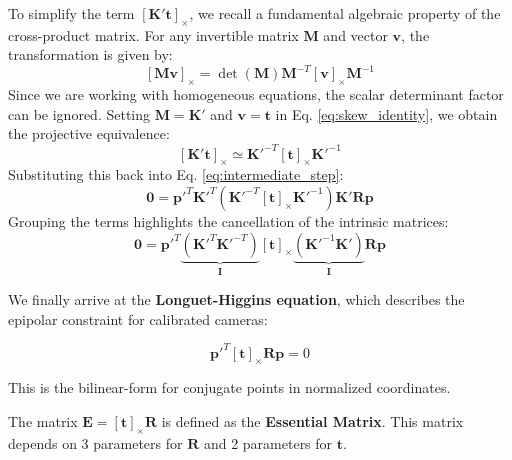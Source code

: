 \documentclass[11pt,a4paper]{article}
\theoremstyle{definition}
\theoremstyle{plain}
\theoremstyle{remark}
\begin{document}
To simplify the term $[\mathbf{K'}\mathbf{t}]_{\times}$, we recall a fundamental algebraic property of the cross-product matrix. For any invertible matrix $\mathbf{M}$ and vector $\mathbf{v}$, the transformation is given by:
\begin{equation} \label{eq:skew_identity}
    [\mathbf{M}\mathbf{v}]_{\times} = \det(\mathbf{M}) \mathbf{M}^{-T} [\mathbf{v}]_{\times} \mathbf{M}^{-1}
\end{equation}
Since we are working with homogeneous equations, the scalar determinant factor can be ignored. Setting $\mathbf{M} = \mathbf{K'}$ and $\mathbf{v} = \mathbf{t}$ in Eq. \eqref{eq:skew_identity}, we obtain the projective equivalence:
\begin{equation} \nonumber
    [\mathbf{K'}\mathbf{t}]_{\times} \simeq \mathbf{K'}^{-T} [\mathbf{t}]_{\times} \mathbf{K'}^{-1}
\end{equation}
Substituting this back into Eq. \eqref{eq:intermediate_step}:
\begin{equation} \nonumber
    \mathbf{0} = \mathbf{p'}^{T} \mathbf{K'}^{T} \left( \mathbf{K'}^{-T} [\mathbf{t}]_{\times} \mathbf{K'}^{-1} \right) \mathbf{K'}\mathbf{R} \mathbf{p}
\end{equation}
Grouping the terms highlights the cancellation of the intrinsic matrices:
\begin{equation} \nonumber
    \mathbf{0} = \mathbf{p'}^{T} \underbrace{\left(\mathbf{K'}^{T} \mathbf{K'}^{-T}\right)}_{\mathbf{I}} [\mathbf{t}]_{\times} \underbrace{\left(\mathbf{K'}^{-1} \mathbf{K'}\right)}_{\mathbf{I}} \mathbf{R} \mathbf{p}
\end{equation}

We finally arrive at the \textbf{Longuet-Higgins equation}, which describes the epipolar constraint for calibrated cameras:

\begin{tcolorbox}[colback=blue!5!white,colframe=blue!75!black,title=Longuet-Higgins Equation]
\begin{equation} \label{eq:longuet_higgins_final}
    \mathbf{p'}^{T} [\mathbf{t}]_{\times} \mathbf{R} \mathbf{p} = 0
\end{equation}
\end{tcolorbox}
This is the bilinear-form for conjugate points in normalized coordinates.

\begin{tcolorbox}[colback=orange!5!white,colframe=orange!75!black,title=Essential Matrix]
The matrix $\mathbf{E} = [\mathbf{t}]_{\times} \mathbf{R}$ is defined as the \textbf{Essential Matrix}.
This matrix depends on 3 parameters for $\mathbf{R}$ and 2 parameters for $\mathbf{t}$.
\end{tcolorbox}
\end{document}
